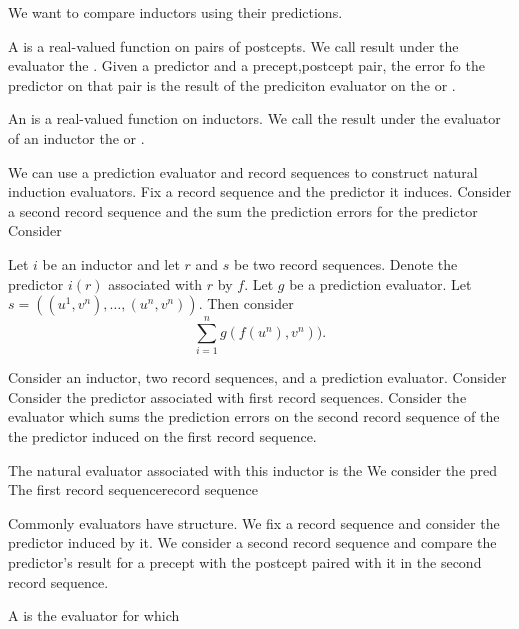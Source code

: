 

We want to compare inductors using
their predictions.


A 
is a real-valued function on
pairs of postcepts.
We call result under the evaluator
the .
Given a predictor and a precept,postcept
pair, the error fo the predictor on
that pair is the result of the prediciton
evaluator on the or
.

An 
is a real-valued function
on inductors.
We call the result under the
evaluator of an inductor the
 or
.

We can use a prediction evaluator
and record sequences to construct
natural induction evaluators.
Fix a record sequence and the predictor
it induces.
Consider a second record sequence
and the sum the prediction errors
for the predictor
Consider



Let $i$ be an inductor and let
$r$ and $s$ be two record sequences.
Denote the predictor $i(r)$ associated
with $r$ by $f$.
Let $g$ be a prediction evaluator.
Let $s = ((u^1, v^n), \dots, (u^n, v^n))$.
Then consider
\[
  \sum_{i = 1}^{n} g(f(u^n), v^n)).
\]



Consider an inductor, two record
sequences, and a prediction evaluator.
Consider
Consider the predictor
associated with first record sequences.
Consider the evaluator which
sums the prediction errors on the
second record sequence of the
the predictor induced on the first record
sequence.

The natural evaluator associated with
this inductor is the
We consider the pred
The first record sequencerecord sequence

Commonly evaluators have
structure.
We fix a record sequence
and consider the predictor
induced by it.
We consider a second
record sequence
and compare the predictor's
result for a precept with
the postcept paired with it
in the second record sequence.


A  is
the evaluator for which
